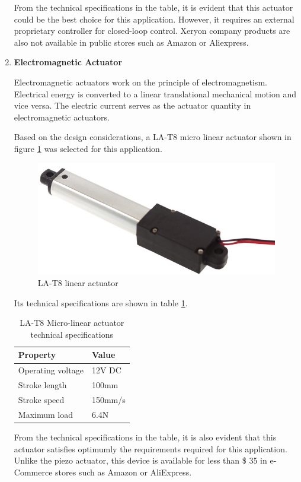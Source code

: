 \begin{enumerate}
    
    From the technical specifications in the table, it is evident that this actuator could be the best choice for this application. However, it requires an external proprietary controller for closed-loop control. Xeryon company products are also not available in public stores such as Amazon or Aliexpress.
    
    \item \textbf{Electromagnetic Actuator}
    \par
    Electromagnetic actuators work on the principle of electromagnetism. Electrical energy is converted to a linear translational mechanical motion and vice versa. The electric current serves as the actuator quantity in electromagnetic actuators.
    \par
    Based on the design considerations, a LA-T8 micro linear actuator shown in figure \ref{fig:la_t8_linear_actuator}  was selected for this application.
    \begin{figure}[H]
        \centering
        \includegraphics[width=.25\textwidth, height=.25\textheight]{Figures/LA-T8.jpg}
        \caption[LA-T8 linear actuator]{LA-T8 linear actuator \cite{la_t8}}
        \label{fig:la_t8_linear_actuator}
    \end{figure}
    Its technical specifications are shown in table \ref{tab:la_t8_tab}.
    \begin{table}[H]
    \centering
    \begin{tabular}{|l|l|}
    \hline
    \textbf{Property} & \textbf{Value} \\ \hline
    Operating voltage & 12V DC \\ \hline
    Stroke length & 100mm \\ \hline
    Stroke speed & 150mm/s \\ \hline
    Maximum load & 6.4N \\ \hline
    \end{tabular}
    \caption[LA-T8 Micro-linear actuator technical specifications]{LA-T8 Micro-linear actuator technical specifications \cite{la_t8}}
    \label{tab:la_t8_tab}
    \end{table}
    From the technical specifications in the table, it is also evident that this actuator satisfies optimumly the requirements required for this application. Unlike the piezo actuator, this device is available for less than \$ 35 in e-Commerce stores such as Amazon or AliExpress.
\end{enumerate}

